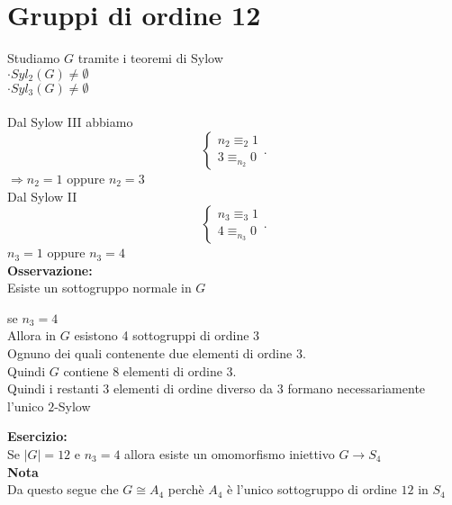\documentclass[12px]{article}
\begin{document}
	\section{Gruppi di ordine 12}
	Studiamo $G$ tramite i teoremi di Sylow\\
	$\cdot Syl_2(G)\neq \emptyset$\\
	 $\cdot Syl_3(G)\neq\emptyset$ \\
	 \hline\ \\
	 Dal Sylow III abbiamo
	 \[
	 \begin{cases}
	 	n_2 \equiv_2 1\\
		3\equiv_{n_2} 0
	 \end{cases}
	 .\] 
	 $ \Rightarrow n_2= 1$ oppure $n_2 = 3$\\
	 Dal Sylow II
	  \[
		  \begin{cases}
		  	
	 n_3\equiv_3 1\\
	 4\equiv_{n_3} 0
		  \end{cases}
	 .\] 
	 $n_3 = 1$ oppure $n_3 = 4$\\
	  \textbf{Osservazione:}\\
	  Esiste un sottogruppo normale in $G$
	  \begin{dimo}
	  	se $n_3 = 4$\\
		Allora in  $G$ esistono 4 sottogruppi di ordine 3\\
		Ognuno dei quali contenente due elementi di ordine 3.\\
		Quindi $G$ contiene 8 elementi di ordine 3.\\
		Quindi i restanti 3 elementi di ordine diverso da 3 formano necessariamente l'unico $2$-Sylow
	  \end{dimo}
	  \textbf{Esercizio:}\\
	  Se $|G| = 12$ e  $n_3 = 4$ allora esiste un omomorfismo iniettivo  $G \rightarrow S_4$\\
	  \textbf{Nota}\\
	  Da questo segue che $G\cong A_4$ perchè $A_4$ è l'unico sottogruppo di ordine $12$ in $S_4$
\end{document}
